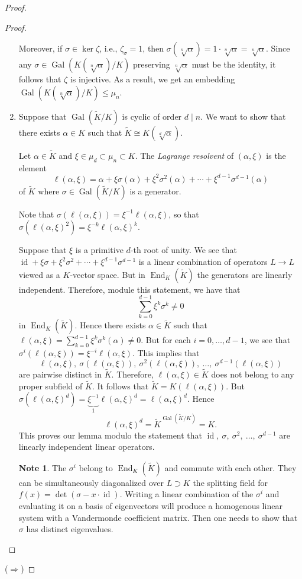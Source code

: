 \documentclass[10pt,letterpaper,cm]{nupset}
\theoremstyle{definition}
\newtheorem{note}[definition]{Note}
\theoremstyle{theorem}
\theoremstyle{remark}
\newcommand{\1}{\mathbf{1}}
\newcommand{\0}{\vec 0}
\DeclareMathOperator{\id}{id}
\DeclareMathOperator{\gal}{Gal}
\DeclareMathOperator{\ed}{End}
\begin{document}
\begin{proof}
\begin{proof}
\begin{enumerate}[label=(\alph*)]
 Moreover, if $\sigma \in \ker{\zeta}$, i.e., $\zeta_{\sigma} = 1$, then $\sigma(\sqrt[n]{\alpha}) = 1 \cdot \sqrt[n]{\alpha} = \sqrt[n]{\alpha}$. Since any $\sigma \in \gal(K(\sqrt[n]{\alpha})/K)$ preserving $\sqrt[n]{\alpha}$ must be the identity, it follows that $\zeta$ is injective. As a result, we get an embedding $\gal(K(\sqrt[n]{\alpha})/K) \leq \mu_n$.
 
\item Suppose that $\gal\left(\widetilde{K}/K\right)$ is cyclic of order $d \mid n$. We want to show that there exists $\alpha \in K$ such that $\widetilde{K} \cong K(\sqrt[d]{\alpha})$. 

Let $ \alpha \in \widetilde{K}$ and $\xi \in \mu_d \subset \mu_n \subset K$. The \textit{Lagrange resolvent} of $\left(\alpha, \xi\right)$ is the element $$ \ell(\alpha, \xi) =    \alpha + \xi \sigma(\alpha) + \xi^2 \sigma^2(\alpha) + \cdots + \xi^{d-1} \sigma^{d-1}(\alpha)$$ of $\widetilde{K}$ where $\sigma \in \gal\left(\widetilde{K}/K\right)$ is a generator. 

Note that $\sigma(\ell(\alpha, \xi)) = \xi^{-1}\ell(\alpha, \xi)$, so that $\sigma(\ell(\alpha, \xi)^2) = \xi^{-k}\ell(\alpha, \xi)^k$.

Suppose that $\xi$ is a primitive $d$-th root of unity.  We see that $\id + \xi \sigma + \xi^2 \sigma^2 + \cdots + \xi^{d-1} \sigma^{d-1}$ is a linear combination of operators $L \to L$ viewed as a $K$-vector space. But in $\ed_K\left(\widetilde{K}\right)$ the generators are linearly independent. Therefore, module this statement, we have that $$ \sum_{k=0}^{d-1} \xi^k \sigma^k  \ne 0 $$ in $\ed_K\left(\widetilde{K}\right)$. Hence there exists $\alpha \in \widetilde{K}$ such that $\ell(\alpha, \xi) = \sum_{k=0}^{d-1} \xi^k \sigma^k(\alpha) \ne 0$. But for each $i=0, \ldots, d-1$, we see that $\sigma^i(\ell(\alpha, \xi)) = \xi^{-i}\ell(\alpha, \xi)$. This implies that $$\ell(\alpha, \xi), \ \sigma(\ell(\alpha, \xi)), \ \sigma^2(\ell(\alpha, \xi)), \ \ldots, \ \sigma^{d-1}(\ell(\alpha, \xi))$$ are pairwise distinct in $\widetilde{K}$. Therefore, $\ell(\alpha, \xi) \in \widetilde{K}$ does not belong to any proper subfield of $\widetilde{K}$. It follows that $\widetilde{K} = K(\ell(\alpha, \xi))$. But $\sigma(\ell(\alpha, \xi)^d) = \underbrace{\xi^{-1}}_{1}\ell(\alpha, \xi)^d = \ell(\alpha, \xi)^d.$ Hence $$\ell(\alpha, \xi)^d = \widetilde{K}^{\gal\left(\widetilde{K}/K\right)} = K.$$This proves our lemma modulo the statement that $\id, \ \sigma, \  \sigma^2, \ \ldots , \ \sigma^{d-1}$ are linearly independent linear operators.
\begin{note}
The $\sigma^i$ belong to $\ed_K\left(\widetilde{K}\right)$ and commute with each other. They can be simultaneously diagonalized over $L \supset K$ the splitting field for $f(x) = \det(\sigma - x \cdot \id)$. Writing a linear combination of the $\sigma^i$ and evaluating it on a basis of eigenvectors will produce a homogenous linear system with a Vandermonde coefficient matrix. Then one needs to show that $\sigma$ has distinct eigenvalues. 
\end{note}
\end{enumerate}
\end{proof}
($\Longrightarrow$) 


\end{proof}
\end{document}
